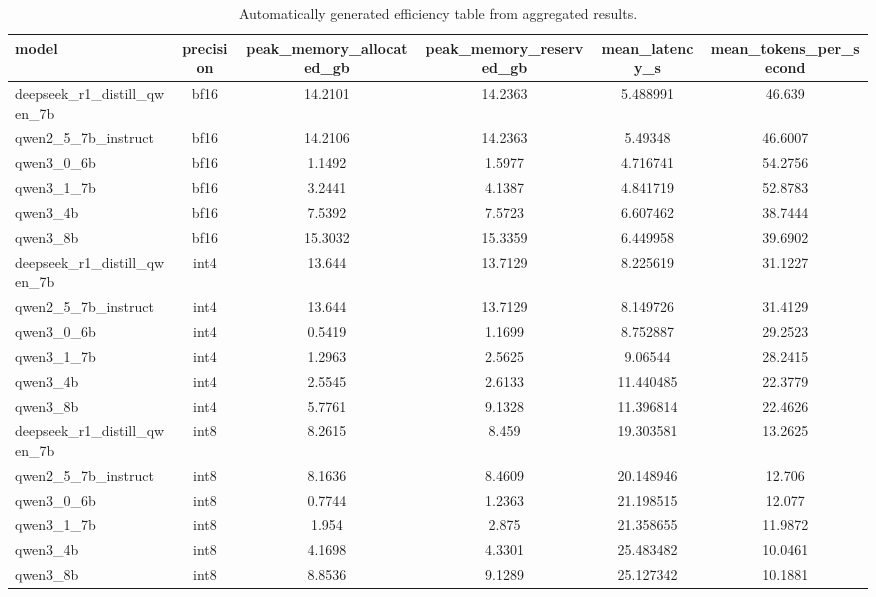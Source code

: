 \begin{table}[t]
\centering
\caption{Automatically generated efficiency table from aggregated results.}
\label{tab:generated-efficiency-results}
\begin{tabular}{lccccc}
\toprule
model & precision & peak\_memory\_allocated\_gb & peak\_memory\_reserved\_gb & mean\_latency\_s & mean\_tokens\_per\_second \\
\midrule
deepseek\_r1\_distill\_qwen\_7b & bf16 & 14.2101 & 14.2363 & 5.488991 & 46.639 \\
qwen2\_5\_7b\_instruct & bf16 & 14.2106 & 14.2363 & 5.49348 & 46.6007 \\
qwen3\_0\_6b & bf16 & 1.1492 & 1.5977 & 4.716741 & 54.2756 \\
qwen3\_1\_7b & bf16 & 3.2441 & 4.1387 & 4.841719 & 52.8783 \\
qwen3\_4b & bf16 & 7.5392 & 7.5723 & 6.607462 & 38.7444 \\
qwen3\_8b & bf16 & 15.3032 & 15.3359 & 6.449958 & 39.6902 \\
deepseek\_r1\_distill\_qwen\_7b & int4 & 13.644 & 13.7129 & 8.225619 & 31.1227 \\
qwen2\_5\_7b\_instruct & int4 & 13.644 & 13.7129 & 8.149726 & 31.4129 \\
qwen3\_0\_6b & int4 & 0.5419 & 1.1699 & 8.752887 & 29.2523 \\
qwen3\_1\_7b & int4 & 1.2963 & 2.5625 & 9.06544 & 28.2415 \\
qwen3\_4b & int4 & 2.5545 & 2.6133 & 11.440485 & 22.3779 \\
qwen3\_8b & int4 & 5.7761 & 9.1328 & 11.396814 & 22.4626 \\
deepseek\_r1\_distill\_qwen\_7b & int8 & 8.2615 & 8.459 & 19.303581 & 13.2625 \\
qwen2\_5\_7b\_instruct & int8 & 8.1636 & 8.4609 & 20.148946 & 12.706 \\
qwen3\_0\_6b & int8 & 0.7744 & 1.2363 & 21.198515 & 12.077 \\
qwen3\_1\_7b & int8 & 1.954 & 2.875 & 21.358655 & 11.9872 \\
qwen3\_4b & int8 & 4.1698 & 4.3301 & 25.483482 & 10.0461 \\
qwen3\_8b & int8 & 8.8536 & 9.1289 & 25.127342 & 10.1881 \\
\bottomrule
\end{tabular}
\end{table}
